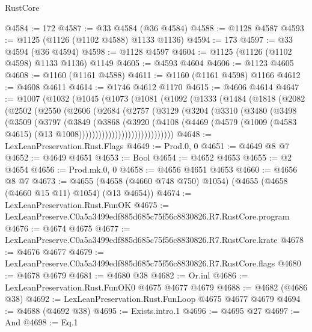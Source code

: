 \begin{lexlean}{RustCore}
\begin{coremodule}
@4584 := 172
@4587 := @33 @4584 (@36 @4584)
@4588 := @1128 @4587
@4593 := @1125 (@1126 (@1102 @4588) @1133 @1136)
@4594 := 173
@4597 := @33 @4594 (@36 @4594)
@4598 := @1128 @4597
@4604 := @1125 (@1126 (@1102 @4598) @1133 @1136) @1149
@4605 := @4593 @4604
@4606 := @1123 @4605
@4608 := @1160 (@1161 @4588)
@4611 := @1160 (@1161 @4598) @1166
@4612 := @4608 @4611
@4614 := @1746 @4612 @1170
@4615 := @4606 @4614
@4647 := @1007
    (@1032
      (@1045
        (@1073
          (@1081
            (@1092
              (@1333
                (@1484
                  (@1818
                    (@2082
                      (@2502
                        (@2550
                          (@2606
                            (@2684
                              (@2757
                                (@3129
                                  (@3204
                                    (@3310
                                      (@3480
                                        (@3498
                                          (@3509
                                            (@3797
                                              (@3849
                                                (@3868
                                                  (@3920
                                                    (@4108
                                                      (@4469
                                                        (@4579
                                                          (@1009
                                                            (@4583 @4615)
                                                            (@13 @1008)))))))))))))))))))))))))))))
@4648 := LexLeanPreservation.Rust.Flags
@4649 := Prod.{0, 0}
@4651 := @4649 @8 @7
@4652 := @4649 @4651
@4653 := Bool
@4654 := @4652 @4653
@4655 := @2 @4654
@4656 := Prod.mk.{0, 0}
@4658 := @4656 @4651 @4653
@4660 := @4656 @8 @7
@4673 := @4655 (@4658 (@4660 @748 @750) @1054) (@4655 (@4658 (@4660 @15 @11) @1054) (@13 @4654))
@4674 := LexLeanPreservation.Rust.FunOK
@4675 := LexLeanPreserve.C0a5a3499edf885d685c75f56c8830826.R7.RustCore.program
@4676 := @4674 @4675
@4677 := LexLeanPreserve.C0a5a3499edf885d685c75f56c8830826.R7.RustCore.krate
@4678 := @4676 @4677
@4679 := LexLeanPreserve.C0a5a3499edf885d685c75f56c8830826.R7.RustCore.flags
@4680 := @4678 @4679
@4681 := @4680 @38
@4682 := Or.inl
@4686 := LexLeanPreservation.Rust.FunOK0 @4675 @4677 @4679
@4688 := @4682 (@4686 @38)
@4692 := LexLeanPreservation.Rust.FunLoop @4675 @4677 @4679
@4694 := @4688 (@4692 @38)
@4695 := Exists.intro.{1}
@4696 := @4695 @27
@4697 := And
@4698 := Eq.{1}

\end{coremodule}
\end{lexlean}
